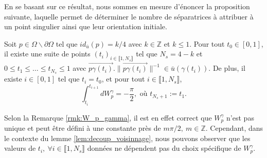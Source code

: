 En se basant sur ce résultat, nous sommes en mesure d'énoncer la proposition suivante, laquelle permet de déterminer le nombre de séparatrices à attribuer à un point singulier ainsi que leur orientation initiale.

\begin{proposition}
    \label{prop:align_sepa_voisinnage}
    Soit $p\in\Omega\backslash\partial\Omega$ tel que $id_{\bar{u}}(p)=k/4$ avec $k\in\mathbb{Z}$ et $k\leq 1$. Pour tout $t_0\in[0, 1]$, il existe une suite de points $(t_i)_{i\in\llbracket1, N_s\rrbracket}$ tel que $N_s=4-k$ et $0\leq t_1\leq\dots\leq t_{N_s}\leq 1$ avec $\overrightarrow{p\gamma(t_i)}.\|\overrightarrow{p\gamma(t_i)}\|^{-1}\in\bar{u}(\gamma(t_i))$. De plus, il existe $i\in [0, 1]$ tel que $t_i=t_0$, et pour tout $i\in\llbracket 1, N_s\rrbracket$,
    $$\int_{t_i}^{t_{i+1}}dW_p^\gamma=-\frac{\pi}{2},\mbox{ où }t_{N_s+1}:=t_1.$$
\end{proposition}

Selon la Remarque \ref{rmk:W_p_gamma}, il est en effet correct que $W_p^\gamma$ n'est pas unique et peut être défini à une constante près de $m\pi/2,~m\in\mathbb{Z}$. Cependant, dans le contexte du lemme \ref{lem:decoup_voisinnage}, nous pouvons observer que les valeurs de $t_i,~\forall i\in\llbracket 1, N_s\rrbracket$ données ne dépendent pas du choix spécifique de $W_p^\gamma$.


